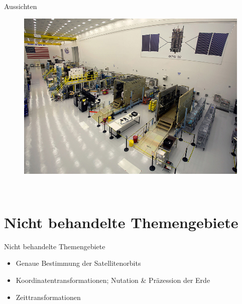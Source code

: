 \begin{frame}{Aussichten}
    \begin{figure}
        \centering
        \includegraphics[height=0.85\textheight]{images/gps-3-construction.jpg}
    \end{figure}
    ~
\end{frame}

\section{Nicht behandelte Themengebiete}
\begin{frame}{Nicht behandelte Themengebiete}
    \begin{itemize}
        \item Genaue Bestimmung der Satellitenorbits
        \item Koordinatentransformationen; Nutation \& Präzession der Erde
        \item Zeittransformationen
    \end{itemize}
\end{frame}

